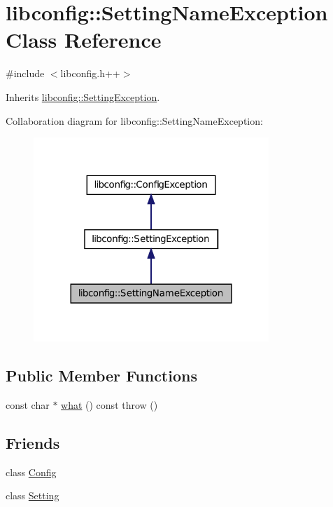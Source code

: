 \hypertarget{classlibconfig_1_1_setting_name_exception}{
\section{libconfig::SettingNameException Class Reference}
\label{classlibconfig_1_1_setting_name_exception}
}


{\ttfamily \#include $<$libconfig.h++$>$}



Inherits \hyperlink{classlibconfig_1_1_setting_exception}{libconfig::SettingException}.



Collaboration diagram for libconfig::SettingNameException:
\nopagebreak
\begin{figure}[H]
\begin{center}
\leavevmode
\includegraphics[width=252pt]{classlibconfig_1_1_setting_name_exception__coll__graph}
\end{center}
\end{figure}
\subsection*{Public Member Functions}
\begin{DoxyCompactItemize}
\item 
const char $\ast$ \hyperlink{classlibconfig_1_1_setting_name_exception_a6a65369f3eb5c02ee92fc71a31c99ebc}{what} () const   throw ()
\end{DoxyCompactItemize}
\subsection*{Friends}
\begin{DoxyCompactItemize}
\item 
class \hyperlink{classlibconfig_1_1_setting_name_exception_ac3da7e21a05bf8852638db7e4dd1b81a}{Config}
\item 
class \hyperlink{classlibconfig_1_1_setting_name_exception_a9aa0bc1c3d297cabf9a1848178294d38}{Setting}
\end{DoxyCompactItemize}


